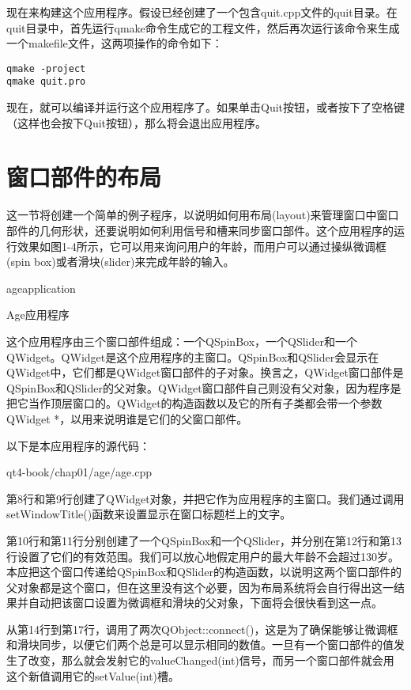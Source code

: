 \documentclass[11pt,oneside]{book}
\begin{document}
\begin{common-format}
现在来构建这个应用程序。假设已经创建了一个包含quit.cpp文件的quit目录。在quit目录中，首先运行qmake命令生成它的工程文件，然后再次运行该命令来生成一个makefile文件，这两项操作的命令如下：
\begin{Verbatim}
qmake -project
qmake quit.pro
\end{Verbatim}

现在，就可以编译并运行这个应用程序了。如果单击Quit按钮，或者按下了空格键（这样也会按下Quit按钮），那么将会退出应用程序。


\section{窗口部件的布局}
这一节将创建一个简单的例子程序，以说明如何用布局(layout)来管理窗口中窗口部件的几何形状，还要说明如何利用信号和槽来同步窗口部件。这个应用程序的运行效果如图1-4所示，它可以用来询问用户的年龄，而用户可以通过操纵微调框(spin box)或者滑块(slider)来完成年龄的输入。
\begin{fig}{ageapplication}
\caption{Age应用程序}
\label{fig:ageapplication}
\end{fig}

这个应用程序由三个窗口部件组成：一个QSpinBox，一个QSlider和一个QWidget。QWidget是这个应用程序的主窗口。QSpinBox和QSlider会显示在QWidget中，它们都是QWidget窗口部件的子对象。换言之，QWidget窗口部件是QSpinBox和QSlider的父对象。QWidget窗口部件自己则没有父对象，因为程序是把它当作顶层窗口的。QWidget的构造函数以及它的所有子类都会带一个参数QWidget *，以用来说明谁是它们的父窗口部件。

以下是本应用程序的源代码：
\begin{cppinput}{qt4-book/chap01/age/age.cpp}
\end{cppinput}

第8行和第9行创建了QWidget对象，并把它作为应用程序的主窗口。我们通过调用setWindowTitle()函数来设置显示在窗口标题栏上的文字。

第10行和第11行分别创建了一个QSpinBox和一个QSlider，并分别在第12行和第13行设置了它们的有效范围。我们可以放心地假定用户的最大年龄不会超过130岁。本应把这个窗口传递给QSpinBox和QSlider的构造函数，以说明这两个窗口部件的父对象都是这个窗口，但在这里没有这个必要，因为布局系统将会自行得出这一结果并自动把该窗口设置为微调框和滑块的父对象，下面将会很快看到这一点。

从第14行到第17行，调用了两次QObject::connect()，这是为了确保能够让微调框和滑块同步，以便它们两个总是可以显示相同的数值。一旦有一个窗口部件的值发生了改变，那么就会发射它的valueChanged(int)信号，而另一个窗口部件就会用这个新值调用它的setValue(int)槽。


\end{common-format}
\end{document}
